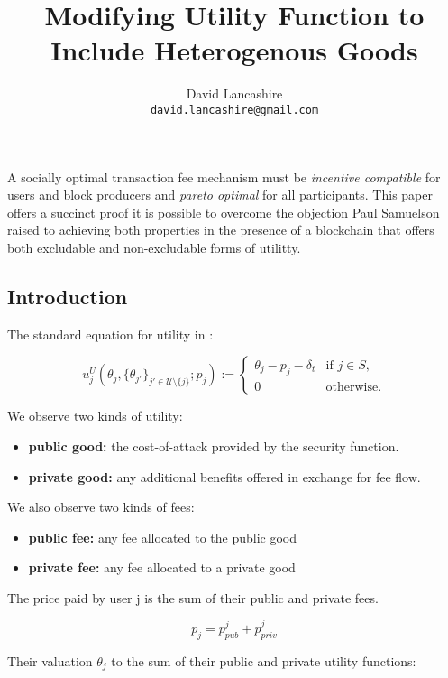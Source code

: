 \documentclass[oneside]{article}   	%
\title{Modifying Utility Function to Include Heterogenous Goods}
\author{
  David Lancashire\\
  \texttt{david.lancashire@gmail.com}\\
}
\begin{document}
\maketitle

\begin{onecolabstract}
A socially optimal transaction fee mechanism must be \textit{incentive compatible} for users and block producers and \textit{pareto optimal} for all participants. This paper offers a succinct proof it is possible to overcome the objection Paul Samuelson raised to achieving both properties in the presence of a blockchain that offers both excludable and non-excludable forms of utilitty.
\end{onecolabstract}
\bigskip 

\subsection*{Introduction}


The standard equation for utility in :

\[
u_j^U(\theta_j, \{\theta_{j'}\}_{j' \in \mathcal{U} \setminus \{j\}}; p_j) := 
\begin{cases} 
\theta_j - p_j - \delta_t & \text{if } j \in S, \\
0 & \text{otherwise.}
\end{cases}
\]

We observe two kinds of utility:

\begin{itemize}
  \item \textbf{public good:} the cost-of-attack provided by the security function.
  \item \textbf{private good:} any additional benefits offered in exchange for fee flow.
\end{itemize}

We also observe two kinds of fees:

\begin{itemize}
  \item \textbf{public fee:} any fee allocated to the public good
  \item \textbf{private fee:} any fee allocated to a private good
\end{itemize}

The price paid by user j is the sum of their public and private fees.

$$
p_j = p_{pub}^j + p_{priv}^j
$$

Their valuation $\theta_j$ to the sum of their public and private utility functions:
\end{document}
